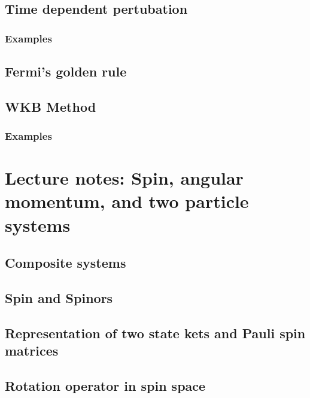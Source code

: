    \chapter{Time dependent pertubation}
      
      
      
      
      
      \section{Examples}
         
            \shipoutAnswer
   \chapter{Fermi's golden rule}
      
      
   \chapter{WKB Method}
      
      \section{Examples}
         
            \shipoutAnswer

\part{Lecture notes: Spin, angular momentum, and two particle systems}

   \chapter{Composite systems}
      
   \chapter{Spin and Spinors}
      
      
   \chapter{Representation of two state kets and Pauli spin matrices}
      
   \chapter{Rotation operator in spin space}
      
      
